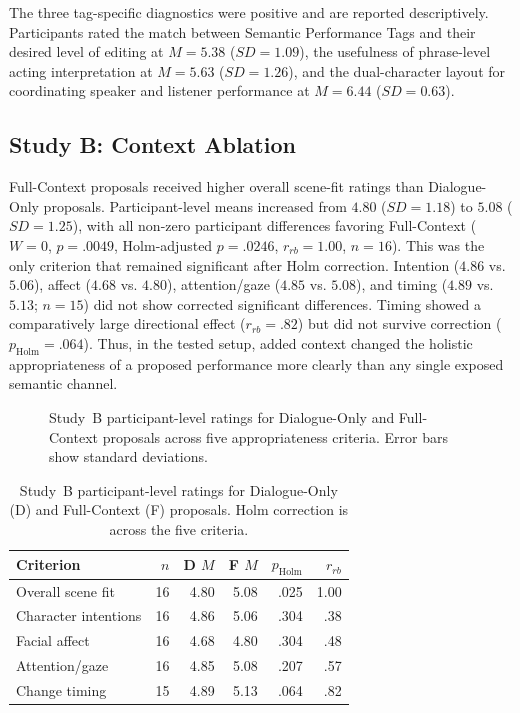 The three tag-specific diagnostics were positive and are reported descriptively. Participants rated the match between Semantic Performance Tags and their desired level of editing at $M=5.38$ ($SD=1.09$), the usefulness of phrase-level acting interpretation at $M=5.63$ ($SD=1.26$), and the dual-character layout for coordinating speaker and listener performance at $M=6.44$ ($SD=0.63$).

\subsection{Study B: Context Ablation}

Full-Context proposals received higher overall scene-fit ratings than Dialogue-Only proposals. Participant-level means increased from $4.80$ ($SD=1.18$) to $5.08$ ($SD=1.25$), with all non-zero participant differences favoring Full-Context ($W=0$, $p=.0049$, Holm-adjusted $p=.0246$, $r_{rb}=1.00$, $n=16$). This was the only criterion that remained significant after Holm correction. Intention ($4.86$ vs. $5.06$), affect ($4.68$ vs. $4.80$), attention/gaze ($4.85$ vs. $5.08$), and timing ($4.89$ vs. $5.13$; $n=15$) did not show corrected significant differences. Timing showed a comparatively large directional effect ($r_{rb}=.82$) but did not survive correction ($p_{\mathrm{Holm}}=.064$). Thus, in the tested setup, added context changed the holistic appropriateness of a proposed performance more clearly than any single exposed semantic channel.

\begin{figure}[t]
    \centering
    
    \caption{Study~B participant-level ratings for Dialogue-Only and Full-Context proposals across five appropriateness criteria. Error bars show standard deviations.}
    \label{fig:study-b-context}
\end{figure}

\begin{table}[t]
\centering
\caption{Study~B participant-level ratings for Dialogue-Only (D) and Full-Context (F) proposals. Holm correction is across the five criteria.}
\label{tab:context-results}
\small
\begin{tabular}{lrrrrr}
\toprule
Criterion & $n$ & D $M$ & F $M$ & $p_{\mathrm{Holm}}$ & $r_{rb}$\\
\midrule
Overall scene fit & 16 & 4.80 & 5.08 & .025 & 1.00\\
Character intentions & 16 & 4.86 & 5.06 & .304 & .38\\
Facial affect & 16 & 4.68 & 4.80 & .304 & .48\\
Attention/gaze & 16 & 4.85 & 5.08 & .207 & .57\\
Change timing & 15 & 4.89 & 5.13 & .064 & .82\\
\bottomrule
\end{tabular}
\end{table}

